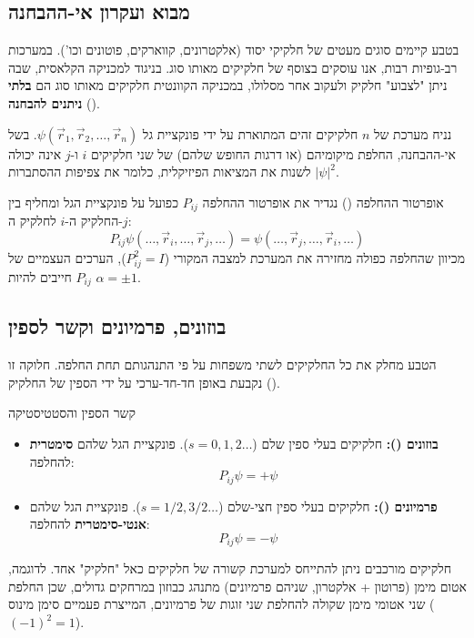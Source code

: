 \subsection{מבוא ועקרון אי-ההבחנה}

בטבע קיימים סוגים מעטים של חלקיקי יסוד (אלקטרונים, קווארקים, פוטונים וכו'). במערכות רב-גופיות רבות, אנו עוסקים בצוסף של חלקיקים מאותו סוג. בניגוד למכניקה הקלאסית, שבה ניתן "לצבוע" חלקיק ולעקוב אחר מסלולו, במכניקה הקוונטית חלקיקים מאותו סוג הם \textbf{בלתי ניתנים להבחנה} ().

נניח מערכת של $n$ חלקיקים זהים המתוארת על ידי פונקציית גל $\psi(\vec{r}_1, \vec{r}_2, \dots, \vec{r}_n)$. בשל אי-ההבחנה, החלפת מיקומיהם (או דרגות החופש שלהם) של שני חלקיקים $i$ ו-$j$ אינה יכולה לשנות את המציאות הפיזיקלית, כלומר את צפיפות ההסתברות $|\psi|^2$.

\begin{definitionbox}{אופרטור ההחלפה ()}
נגדיר את אופרטור ההחלפה $P_{ij}$ כפועל על פונקציית הגל ומחליף בין החלקיק ה-$i$ לחלקיק ה-$j$:
\[ P_{ij} \psi(\dots, \vec{r}_i, \dots, \vec{r}_j, \dots) = \psi(\dots, \vec{r}_j, \dots, \vec{r}_i, \dots) \]
מכיוון שהחלפה כפולה מחזירה את המערכת למצבה המקורי ($P_{ij}^2 = I$), הערכים העצמיים של $P_{ij}$ חייבים להיות $\alpha = \pm 1$.
\end{definitionbox}

\subsection{בוזונים, פרמיונים וקשר לספין}

הטבע מחלק את כל החלקיקים לשתי משפחות על פי התנהגותם תחת החלפה. חלוקה זו נקבעת באופן חד-חד-ערכי על ידי הספין של החלקיק ().

\begin{theorembox}{קשר הספין והסטטיסטיקה}
\begin{itemize}
    \item \textbf{בוזונים ():} חלקיקים בעלי ספין שלם ($s=0, 1, 2 \dots$). פונקציית הגל שלהם \textbf{סימטרית} להחלפה:
    \[ P_{ij} \psi = +\psi \]
    \item \textbf{פרמיונים ():} חלקיקים בעלי ספין חצי-שלם ($s=1/2, 3/2 \dots$). פונקציית הגל שלהם \textbf{אנטי-סימטרית} להחלפה:
    \[ P_{ij} \psi = -\psi \]
\end{itemize}
\end{theorembox}

\begin{notebox}{חלקיקים מורכבים}
ניתן להתייחס למערכת קשורה של חלקיקים כאל "חלקיק" אחד. לדוגמה, אטום מימן (פרוטון + אלקטרון, שניהם פרמיונים) מתנהג כבוזון במרחקים גדולים, שכן החלפת שני אטומי מימן שקולה להחלפת שני זוגות של פרמיונים, המייצרת פעמיים סימן מינוס ($(-1)^2 = 1$).
\end{notebox}

